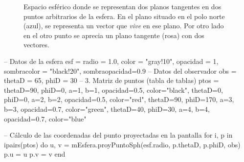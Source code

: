 \begin{figure}[ht]
\begin{tikzpicture}
  \end{tikzpicture}
  \caption{Espacio esférico donde se representan dos planos tangentes en dos puntos
    arbitrarios de la esfera. En el plano situado en el polo norte (azul), se representa
    un vector que \emph{vive} en ese plano. Por otro lado en el otro punto se aprecia
    un plano tangente (rosa) con dos vectores.}
  \label{fig:R2-cart_planos_tangentes}
\end{figure}

\begin{luacode*}
  -- Datos de la esfera
  esf = {
    radio = 1.0, color = "gray!10", opacidad = 1,
    sombracolor = "black!20", sombraopacidad=0.9
  }
  -- Datos del observador
  obs = {thetaD = 65, phiD = 30}
  -- 3. Matriz de puntos (tabla de tablas)
  ptos = {
    {thetaD=90, phiD=0, a=1, b=1, opacidad=0.5, color="black"},
    {thetaD=0, phiD=0, a=2, b=2, opacidad=0.5, color="red"},
    {thetaD=90, phiD=170, a=3, b=3, opacidad=0.7, color="green"},
    {thetaD=40, phiD=30, a=4, b=4, opacidad=0.7, color="blue"}
  }

  -- Cálculo de las coordenadas del punto proyectadas en la pantalla
  for i, p in ipairs(ptos) do
     u, v = mEsfera.proyPuntoSph(esf.radio, p.thetaD, p.phiD, obs)
     p.u = u
     p.v = v
  end
\end{luacode*}

{\scriptsize
{}
}

\begin{figure}[ht]
  \def\scl{1}
\end{figure}


